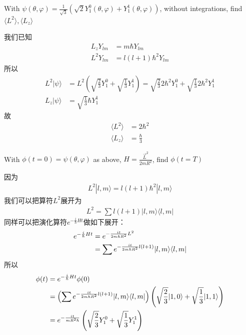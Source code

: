 \documentclass[UTF8,12pt]{article} %
\makeatletter
\newenvironment{proof}[1][\protect\proofname]{\par
\normalfont\topsep6\p@\@plus6\p@\relax
\trivlist
\itemindent\parindent
\item[\hskip\labelsep
\scshape
#1]\ignorespaces
}{%
\endtrivlist\@endpefalse
}
\renewcommand{\proofname}{\it{Solution}}
\makeatother
\begin{document}
\begin{exercise}{}{}
With $\psi(\theta,\varphi) = \frac{1}{\sqrt{3}}\left(\sqrt{2}Y_1^0(\theta,\varphi) + Y_1^1(\theta,\varphi)\right)$, without integrations, find $\langle L^2\rangle, \langle L_z\rangle$
\end{exercise}

\begin{proof}[解]
我们已知
\begin{align*}
L_z Y_{lm} &= m\hbar Y_{lm} \\
L^2 Y_{lm} &= l(l+1)\hbar^2 Y_{lm}
\end{align*}
所以
\begin{align}
L^2|\psi\rangle &= L^2\left(\sqrt{\frac{2}{3}}Y_1^0 + \sqrt{\frac{1}{3}}Y_1^1\right) = \sqrt{\frac{2}{3}}2\hbar^2Y_1^0 + \sqrt{\frac{1}{3}}2\hbar^2Y_1^1 \\
L_z|\psi\rangle &= \sqrt{\frac{1}{3}}\hbar Y_1^1
\end{align}
故
\begin{align}
\langle L^2\rangle &= 2\hbar^2 \\
\langle L_z\rangle &= \frac{\hbar}{3}
\end{align}
\end{proof}

\begin{exercise}{}{}
With $\phi(t=0) = \psi(\theta,\varphi)$ as above, $H = \frac{\vec{L}^2}{2mR^2}$, find $\phi(t=T)$
\end{exercise}

\begin{proof}[解]
因为
\begin{align}
L^2 |l,m\rangle = l(l+1)\hbar^2 |l,m\rangle
\end{align}
我们可以把算符$L^2$展开为
\begin{align}
L^2 = \sum l(l+1)|l,m\rangle\langle l,m|
\end{align}
同样可以把演化算符$e^{-\frac{i}{\hbar}Ht}$做如下展开：
\begin{align}
e^{-\frac{i}{\hbar}Ht} &= e^{-\frac{it}{2m\hbar R^2}L^2} \notag\\
&= \sum e^{-\frac{it}{2m\hbar R^2}l(l+1)} |l,m\rangle\langle l,m|
\end{align}
所以
\begin{align}
\phi(t) &= e^{-\frac{i}{\hbar}Ht}\phi(0) \notag\\
&= \left(\sum e^{-\frac{it}{2m\hbar R^2}l(l+1)} |l,m\rangle\langle l,m|\right) \left(\sqrt{\frac{2}{3}}|1,0\rangle + \sqrt{\frac{1}{3}}|1,1\rangle\right) \notag\\
&= e^{-\frac{it}{mR^2\hbar}}\left(\sqrt{\frac{2}{3}}Y_1^0 + \sqrt{\frac{1}{3}}Y_1^1\right)
\end{align}
\end{proof}
\end{document}
